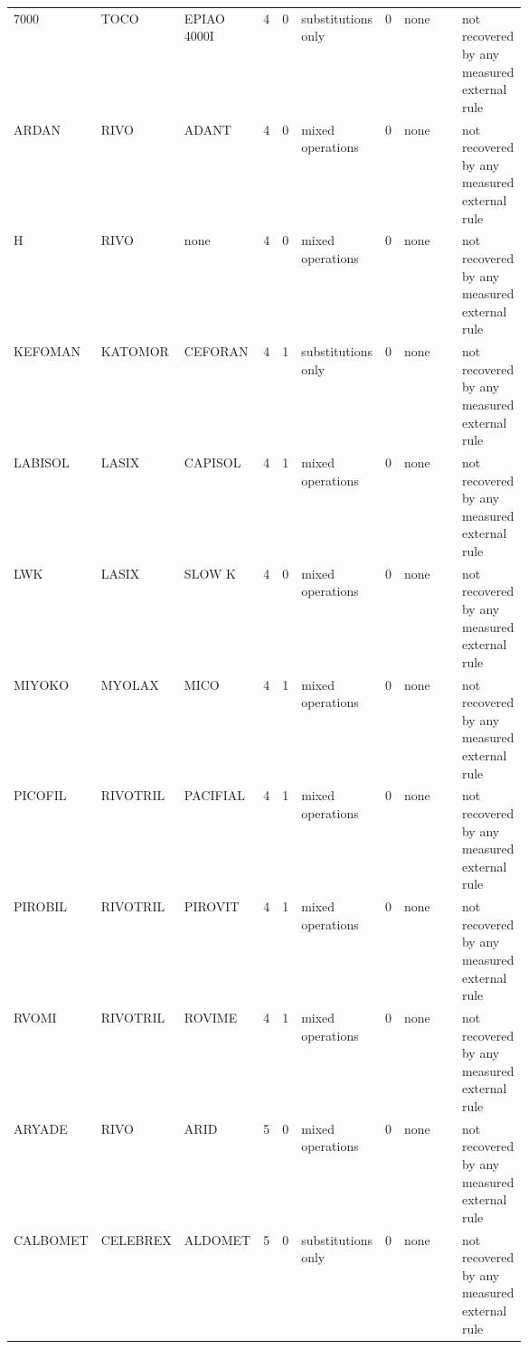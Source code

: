 \begin{landscape}
\begin{tiny}
\begin{longtable}{@{}L{0.08\linewidth}L{0.09\linewidth}L{0.09\linewidth}rrL{0.10\linewidth}rL{0.18\linewidth}L{0.12\linewidth}@{}}
7000 & TOCO & EPIAO 4000I & 4 & 0 & substitutions only & 0 & none & not recovered by any measured external rule \\
ARDAN & RIVO & ADANT & 4 & 0 & mixed operations & 0 & none & not recovered by any measured external rule \\
H & RIVO & none & 4 & 0 & mixed operations & 0 & none & not recovered by any measured external rule \\
KEFOMAN & KATOMOR & CEFORAN & 4 & 1 & substitutions only & 0 & none & not recovered by any measured external rule \\
LABISOL & LASIX & CAPISOL & 4 & 1 & mixed operations & 0 & none & not recovered by any measured external rule \\
LWK & LASIX & SLOW K & 4 & 0 & mixed operations & 0 & none & not recovered by any measured external rule \\
MIYOKO & MYOLAX & MICO & 4 & 1 & mixed operations & 0 & none & not recovered by any measured external rule \\
PICOFIL & RIVOTRIL & PACIFIAL & 4 & 1 & mixed operations & 0 & none & not recovered by any measured external rule \\
PIROBIL & RIVOTRIL & PIROVIT & 4 & 1 & mixed operations & 0 & none & not recovered by any measured external rule \\
RVOMI & RIVOTRIL & ROVIME & 4 & 1 & mixed operations & 0 & none & not recovered by any measured external rule \\
ARYADE & RIVO & ARID & 5 & 0 & mixed operations & 0 & none & not recovered by any measured external rule \\
CALBOMET & CELEBREX & ALDOMET & 5 & 0 & substitutions only & 0 & none & not recovered by any measured external rule \\
\bottomrule
\end{longtable}
\end{tiny}

\end{landscape}

